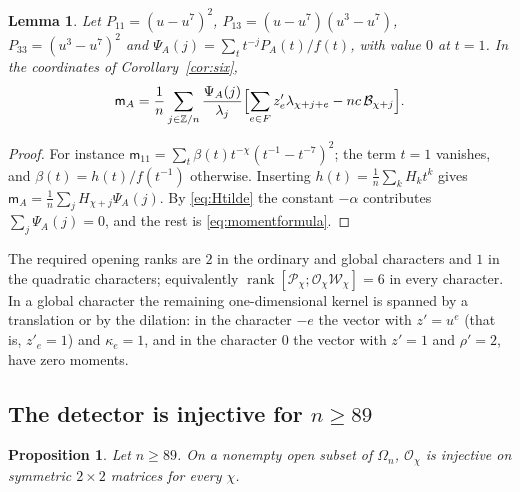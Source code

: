 \documentclass{amsart}
\newtheorem{proposition}[theorem]{Proposition}
\newtheorem{lemma}[theorem]{Lemma}
\theoremstyle{definition}
\theoremstyle{remark}
\numberwithin{equation}{section}
\newcommand{\ZZ}{\mathbb{Z}}
\DeclareMathOperator{\rank}{rank}
\begin{document}
\begin{lemma}\label{lem:momentformula}
Let $P_{11}=(u-u^7)^2$, $P_{13}=(u-u^7)(u^3-u^7)$, $P_{33}=(u^3-u^7)^2$ and
$\Psi_A(j)=\sum_tt^{-j}P_A(t)/f(t)$, with value $0$ at $t=1$. In the coordinates of
Corollary~\ref{cor:six},
\begin{equation}\label{eq:momentformula}
  \mathsf m_A=\frac1n\sum_{j\in\ZZ/n}\frac{\Psi_A(j)}{\lambda_j}
  \Bigl[\sum_{e\in F}z'_e\lambda_{\chi+j+e}-nc\,\mathcal B_{\chi+j}\Bigr].
\end{equation}
\end{lemma}

\begin{proof}
For instance $\mathsf m_{11}=\sum_t\beta(t)t^{-\chi}(t^{-1}-t^{-7})^2$; the term $t=1$
vanishes, and $\beta(t)=h(t)/f(t^{-1})$ otherwise. Inserting
$h(t)=\frac1n\sum_kH_kt^k$ gives $\mathsf m_A=\frac1n\sum_jH_{\chi+j}\Psi_A(j)$. By
\eqref{eq:Htilde} the constant $-\alpha$ contributes $\sum_j\Psi_A(j)=0$, and the rest
is \eqref{eq:momentformula}.
\end{proof}

The required opening ranks are $2$ in the ordinary and
global characters and $1$ in the quadratic characters; equivalently
$\rank[\mathcal P_\chi;\mathcal O_\chi\mathcal W_\chi]=6$ in every character. In a global character the remaining
one-dimensional kernel is spanned by a translation or by the dilation: in the
character $-e$ the vector with $z'=u^e$ (that is, $z'_e=1$) and $\kappa_e=1$, and in
the character $0$ the vector with $z'=1$ and $\rho'=2$, have zero moments.

\subsection{The detector is injective for \texorpdfstring{$n\ge89$}{n >= 89}}
\begin{proposition}\label{prop:detector}
Let $n\ge89$. On a nonempty open subset of $\Omega_n$, $\mathcal O_\chi$ is injective on
symmetric $2\times2$ matrices for every $\chi$.
\end{proposition}
\end{document}
